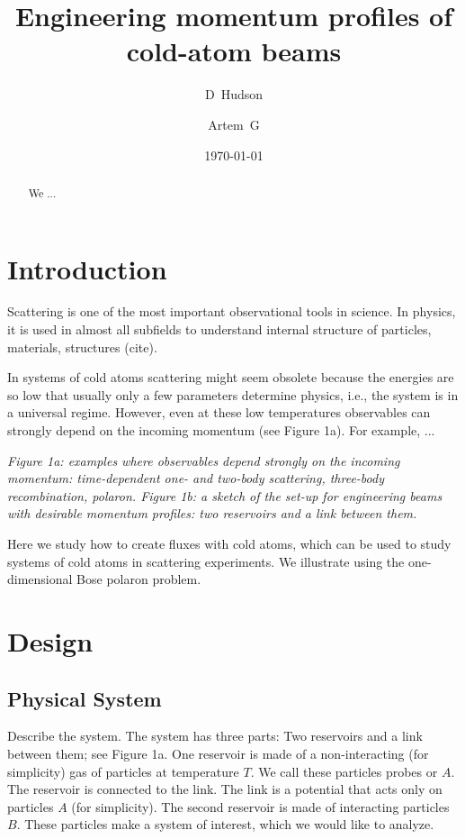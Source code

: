 \documentclass[twocolumn,amsmath,amssymb,showpacs,prl,superscriptaddress,aps]{revtex4-1}
\begin{document}
\title{Engineering momentum profiles of cold-atom beams}

\author{D~Hudson }

\author{Artem~G }


\date{\today}

\begin{abstract}
We ...
\end{abstract}


\maketitle

\section{Introduction}

Scattering is one of the most important observational tools in science. In physics, it is used in almost all subfields to understand internal structure of particles, materials, structures (cite).  

In systems of cold atoms scattering might seem obsolete because the energies are so low that usually only a few parameters determine physics, i.e., the system is in a universal regime. However, even at these low temperatures observables can strongly depend on the incoming momentum (see Figure 1a). For example, ...

{\it Figure 1a: examples where observables depend strongly on the incoming momentum: time-dependent one- and two-body scattering, three-body recombination,  polaron. 
Figure 1b: a sketch of the set-up for engineering beams with desirable momentum profiles: two reservoirs and a link between them.}

Here we study how to create fluxes with cold atoms, which can be used to study systems of cold atoms in scattering experiments. We illustrate using the one-dimensional Bose polaron problem.

\section{Design}

\subsection{Physical System}
Describe the system. The system has three parts: Two reservoirs and a link between them; see Figure 1a. One reservoir is made of a non-interacting (for simplicity) gas of particles at temperature $T$. We call these particles probes or $A$. The reservoir is connected to the link. The link is a potential that acts only on particles $A$ (for simplicity). The second reservoir is made of interacting particles $B$. These particles make a system of interest, which we would like to analyze. 
\end{document}
